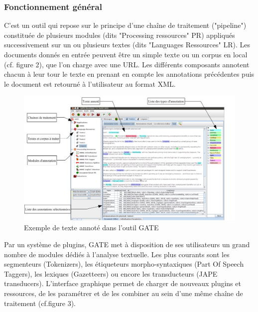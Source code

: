 \documentclass[a4paper, 11pt]{report}
\begin{document}
\subsubsection{Fonctionnement général}
C'est un outil qui repose sur le principe d'une chaîne de traitement ("pipeline") constituée de plusieurs modules (dits "Processing ressources" PR) appliqués successivement sur un ou plusieurs textes (dits "Languages Ressources" LR). Les documents donnés en entrée peuvent être un simple texte ou un corpus en local (cf. figure 2), que l'on charge avec une URL. Les différents composants annotent chacun à leur tour le texte en prenant en compte les annotations précédentes puis le document est retourné à l'utilisateur au format XML.\cite{SL10}
\begin{figure}[H]
\begin{center}
\includegraphics[scale=0.3]{img/exempleAnnotationGATE.png} 
\end{center}
\caption{Exemple de texte annoté dans l'outil GATE}
\end{figure}
Par un système de plugins, GATE met à disposition de ses utilisateurs un grand nombre de
modules dédiés à l'analyse textuelle. Les plus courants sont les segmenteurs (Tokenizers), les
étiqueteurs morpho-syntaxiques (Part Of Speech Taggers), les lexiques (Gazetteers) ou encore les
transducteurs (JAPE transducers). L'interface graphique permet de charger de nouveaux plugins et
ressources, de les paramétrer et de les combiner au sein d'une même chaîne de traitement (cf.figure 3).\cite{SL10}
\end{document}
